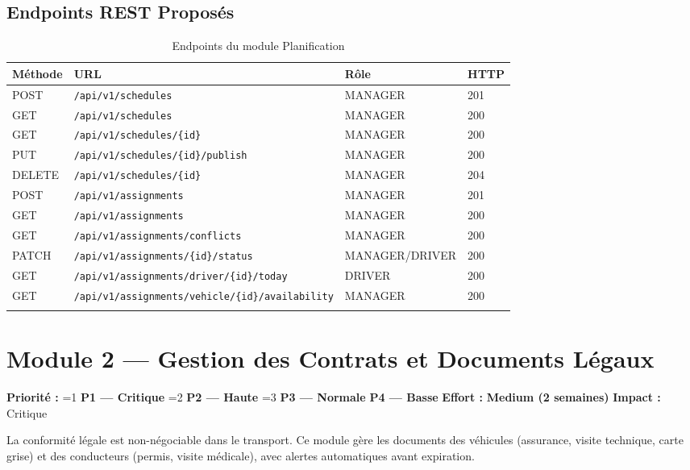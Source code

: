 \documentclass[12pt,a4paper]{report}
\newcommand{\prio}[1]{%
  \ifnum#1=1 \textcolor{fleeterror}{\textbf{P1 — Critique}}%
  \else\ifnum#1=2 \textcolor{fleetwarning}{\textbf{P2 — Haute}}%
  \else\ifnum#1=3 \textcolor{fleetsuccess}{\textbf{P3 — Normale}}%
  \else \textcolor{fleetgray}{\textbf{P4 — Basse}}%
  \fi\fi\fi}
\newcommand{\effort}[1]{\textcolor{fleetpurple}{\textbf{#1}}}
\begin{document}
\section{Endpoints REST Proposés}

\begin{longtable}{p{1.5cm}p{6.5cm}p{2.5cm}p{2cm}}
\toprule
\textbf{Méthode} & \textbf{URL} & \textbf{Rôle} & \textbf{HTTP} \\
\midrule
\endhead
POST & \texttt{/api/v1/schedules} & MANAGER & 201 \\
GET & \texttt{/api/v1/schedules} & MANAGER & 200 \\
GET & \texttt{/api/v1/schedules/\{id\}} & MANAGER & 200 \\
PUT & \texttt{/api/v1/schedules/\{id\}/publish} & MANAGER & 200 \\
DELETE & \texttt{/api/v1/schedules/\{id\}} & MANAGER & 204 \\
POST & \texttt{/api/v1/assignments} & MANAGER & 201 \\
GET & \texttt{/api/v1/assignments} & MANAGER & 200 \\
GET & \texttt{/api/v1/assignments/conflicts} & MANAGER & 200 \\
PATCH & \texttt{/api/v1/assignments/\{id\}/status} & MANAGER/DRIVER & 200 \\
GET & \texttt{/api/v1/assignments/driver/\{id\}/today} & DRIVER & 200 \\
GET & \texttt{/api/v1/assignments/vehicle/\{id\}/availability} & MANAGER & 200 \\
\bottomrule
\caption{Endpoints du module Planification}
\end{longtable}

\chapter{Module 2 — Gestion des Contrats et Documents Légaux}

\begin{tcolorbox}[colback=fleeterror!5, colframe=fleeterror, title={\bfseries Résumé du Module}, fonttitle=\color{white}]
\textbf{Priorité :} \prio{1} \quad \textbf{Effort :} \effort{Medium (2 semaines)} \quad \textbf{Impact :} Critique

La conformité légale est non-négociable dans le transport. Ce module gère les documents des véhicules (assurance, visite technique, carte grise) et des conducteurs (permis, visite médicale), avec alertes automatiques avant expiration.
\end{tcolorbox}
\end{document}
